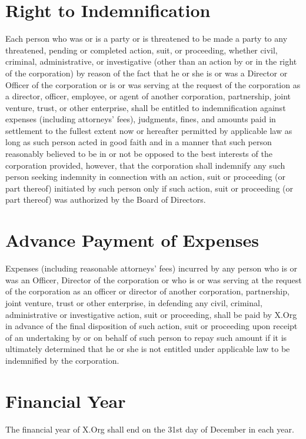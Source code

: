 \documentclass[10pt, english]{bylaws}
\begin{document}
\section{Right to Indemnification}
Each person who was or is a party or is threatened to be made a party to any
threatened, pending or completed action, suit, or proceeding, whether civil,
criminal, administrative, or investigative (other than an action by or in the
right of the corporation) by reason of the fact that he or she is or was a
Director or Officer of the corporation or is or was serving at the request of
the corporation as a director, officer, employee, or agent of another
corporation, partnership, joint venture, trust, or other enterprise, shall be
entitled to indemnification against expenses (including attorneys' fees),
judgments, fines, and amounts paid in settlement to the fullest extent now or
hereafter permitted by applicable law as long as such person acted in good faith
and in a manner that such person reasonably believed to be in or not be opposed
to the best interests of the corporation provided, however, that the corporation
shall indemnify any such person seeking indemnity in connection with an action,
suit or proceeding (or part thereof) initiated by such person only if such
action, suit or proceeding (or part thereof) was authorized by the Board of
Directors.

\section{Advance Payment of Expenses}
Expenses (including reasonable attorneys' fees) incurred by any person who is or
was an Officer, Director of the corporation or who is or was serving at the
request of the corporation as an officer or director of another corporation,
partnership, joint venture, trust or other enterprise, in defending any civil,
criminal, administrative or investigative action, suit or proceeding, shall be
paid by X.Org in advance of the final disposition of such action, suit
or proceeding upon receipt of an undertaking by or on behalf of such person to
repay such amount if it is ultimately determined that he or she is not entitled
under applicable law to be indemnified by the corporation.


\section{Financial Year}
The financial year of X.Org shall end on the 31st day of December in each year.
\end{document}
